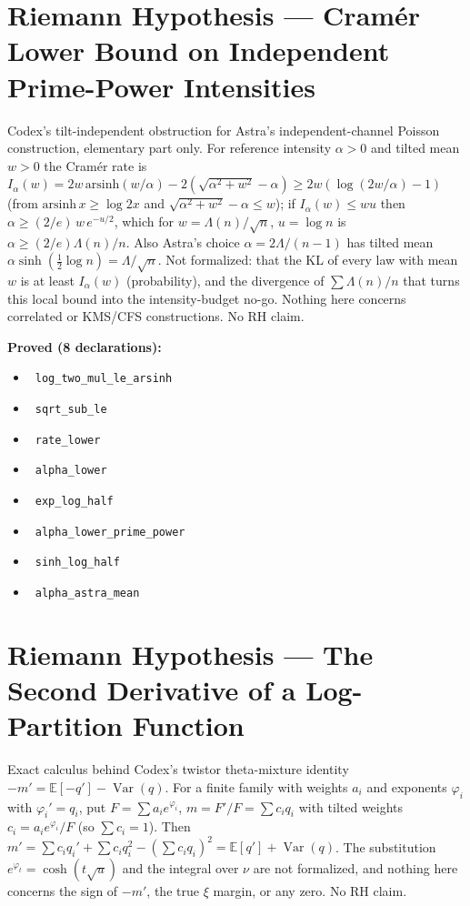 \documentclass{report}
\theoremstyle{definition}
\begin{document}
\section{Riemann Hypothesis --- Cram\'er Lower Bound on Independent Prime-Power Intensities}
Codex's tilt-independent obstruction for Astra's independent-channel Poisson construction, elementary part only. For reference intensity $\alpha>0$ and tilted mean $w>0$ the Cram\'er rate is $I_\alpha(w)=2w\,\mathrm{arsinh}(w/\alpha)-2(\sqrt{\alpha^2+w^2}-\alpha)\ge 2w(\log(2w/\alpha)-1)$ (from $\mathrm{arsinh}\,x\ge\log 2x$ and $\sqrt{\alpha^2+w^2}-\alpha\le w$); if $I_\alpha(w)\le wu$ then $\alpha\ge(2/e)\,w\,e^{-u/2}$, which for $w=\Lambda(n)/\sqrt n$, $u=\log n$ is $\alpha\ge(2/e)\Lambda(n)/n$. Also Astra's choice $\alpha=2\Lambda/(n-1)$ has tilted mean $\alpha\sinh(\tfrac12\log n)=\Lambda/\sqrt n$. Not formalized: that the KL of every law with mean $w$ is at least $I_\alpha(w)$ (probability), and the divergence of $\sum\Lambda(n)/n$ that turns this local bound into the intensity-budget no-go. Nothing here concerns correlated or KMS/CFS constructions. No RH claim.

\noindent\textbf{Proved (8 declarations):}
\begin{itemize}
  \item {}\leanok\ \texttt{log\_two\_mul\_le\_arsinh}
  \item {}\leanok\ \texttt{sqrt\_sub\_le}
  \item {}\leanok\ \texttt{rate\_lower}
  \item {}\leanok\ \texttt{alpha\_lower}
  \item {}\leanok\ \texttt{exp\_log\_half}
  \item {}\leanok\ \texttt{alpha\_lower\_prime\_power}
  \item {}\leanok\ \texttt{sinh\_log\_half}
  \item {}\leanok\ \texttt{alpha\_astra\_mean}
\end{itemize}

\section{Riemann Hypothesis --- The Second Derivative of a Log-Partition Function}
Exact calculus behind Codex's twistor theta-mixture identity $-m'=\mathbb E[-q']-\operatorname{Var}(q)$. For a finite family with weights $a_i$ and exponents $\varphi_i$ with $\varphi_i'=q_i$, put $F=\sum a_ie^{\varphi_i}$, $m=F'/F=\sum c_iq_i$ with tilted weights $c_i=a_ie^{\varphi_i}/F$ (so $\sum c_i=1$). Then $m'=\sum c_iq_i'+\sum c_iq_i^2-(\sum c_iq_i)^2=\mathbb E[q']+\operatorname{Var}(q)$. The substitution $e^{\varphi_t}=\cosh(t\sqrt u)$ and the integral over $\nu$ are not formalized, and nothing here concerns the sign of $-m'$, the true $\xi$ margin, or any zero. No RH claim.
\end{document}
